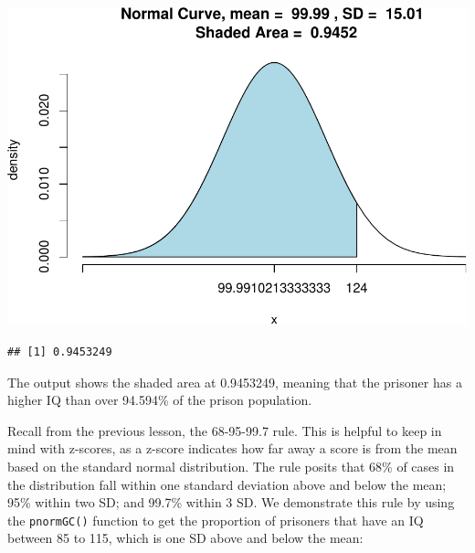\documentclass[
]{book}
\newenvironment{Shaded}{\begin{snugshade}}{\end{snugshade}}
\newcommand{\AttributeTok}[1]{\textcolor[rgb]{0.77,0.63,0.00}{#1}}
\newcommand{\CommentTok}[1]{\textcolor[rgb]{0.56,0.35,0.01}{\textit{#1}}}
\newcommand{\ConstantTok}[1]{\textcolor[rgb]{0.00,0.00,0.00}{#1}}
\newcommand{\DecValTok}[1]{\textcolor[rgb]{0.00,0.00,0.81}{#1}}
\newcommand{\FunctionTok}[1]{\textcolor[rgb]{0.00,0.00,0.00}{#1}}
\newcommand{\NormalTok}[1]{#1}
\newcommand{\OtherTok}[1]{\textcolor[rgb]{0.56,0.35,0.01}{#1}}
\newcommand{\SpecialCharTok}[1]{\textcolor[rgb]{0.00,0.00,0.00}{#1}}
\newcommand{\StringTok}[1]{\textcolor[rgb]{0.31,0.60,0.02}{#1}}
\begin{document}
\begin{Shaded}
\end{Shaded}

\includegraphics{06-hypotheses_files/figure-latex/unnamed-chunk-24-1.pdf}

\begin{verbatim}
## [1] 0.9453249
\end{verbatim}

The output shows the shaded area at 0.9453249, meaning that the prisoner has a higher IQ than over 94.594\% of the prison population.

Recall from the previous lesson, the 68-95-99.7 rule. This is helpful to keep in mind with z-scores, as a z-score indicates how far away a score is from the mean based on the standard normal distribution. The rule posits that 68\% of cases in the distribution fall within one standard deviation above and below the mean; 95\% within two SD; and 99.7\% within 3 SD. We demonstrate this rule by using the \texttt{pnormGC()} function to get the proportion of prisoners that have an IQ between 85 to 115, which is one SD above and below the mean:
\end{document}
